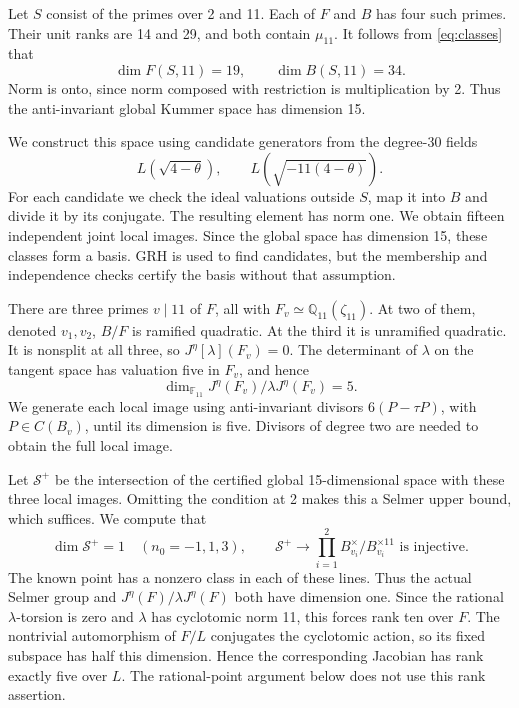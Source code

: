 \documentclass[11pt,reqno]{amsart}
\newcommand{\Q}{\mathbb Q}\newcommand{\Z}{\mathbb Z}
\newcommand{\F}{\mathbb F}\newcommand{\OO}{\mathcal O}
\theoremstyle{definition}\newtheorem{definition}[theorem]{Definition}
\theoremstyle{remark}\newtheorem{remark}[theorem]{Remark}
\numberwithin{equation}{section}
\begin{document}
Let \(S\) consist of the primes over 2 and 11. Each of \(F\) and \(B\)
has four such primes. Their unit ranks are 14 and 29, and both contain
\(\mu_{11}\). It follows from \eqref{eq:classes} that
\[
 \dim F(S,11)=19,\qquad \dim B(S,11)=34.
\]
Norm is onto, since norm composed with restriction is multiplication by
2. Thus the anti-invariant global Kummer space has dimension 15.

We construct this space using candidate generators from the
degree-30 fields
\[
 L(\sqrt{4-\theta}),\qquad L(\sqrt{-11(4-\theta)}).
\]
For each candidate we check the ideal valuations outside \(S\),
map it into \(B\) and divide it by its conjugate. The resulting
element has norm one. We obtain fifteen independent joint local
images. Since the global space has dimension 15, these classes form
a basis. GRH is used to find candidates, but the membership and
independence checks certify the basis without that assumption.

There are three primes \(v\mid11\) of \(F\), all with
\(F_v\simeq\Q_{11}(\zeta_{11})\). At two of them, denoted \(v_1,v_2\),
\(B/F\) is ramified quadratic. At the third it is unramified quadratic.
It is nonsplit at all three, so \(J^\eta[\lambda](F_v)=0\).
The determinant of \(\lambda\) on the tangent space has valuation five
in \(F_v\), and hence
\[
 \dim_{\F_{11}} J^\eta(F_v)/\lambda J^\eta(F_v)=5.
\]
We generate each local image using anti-invariant divisors
\(6(P-\tau P)\), with \(P\in C(B_v)\), until its dimension is five.
Divisors of degree two are needed to obtain the full local image.

Let \(\mathcal S^+\) be the intersection of the certified global
15-dimensional space with these three local images. Omitting the
condition at 2 makes this a Selmer upper bound, which suffices. We compute that
\begin{equation}\label{eq:selmer}
 \dim\mathcal S^+=1\quad(n_0=-1,1,3),\qquad
 \mathcal S^+\longrightarrow
 \prod_{i=1}^2 B_{v_i}^\times/B_{v_i}^{\times11}
 \text{ is injective}.
\end{equation}
The known point has a nonzero class in each of these lines. Thus the
actual Selmer group and \(J^\eta(F)/\lambda J^\eta(F)\) both have
dimension one. Since the rational \(\lambda\)-torsion is zero and
\(\lambda\) has cyclotomic norm 11, this forces rank ten over \(F\).
The nontrivial automorphism of \(F/L\) conjugates the cyclotomic
action, so its fixed subspace has half this dimension. Hence the corresponding
Jacobian has rank exactly five over \(L\).
The rational-point argument below does not use this rank assertion.
\end{document}
